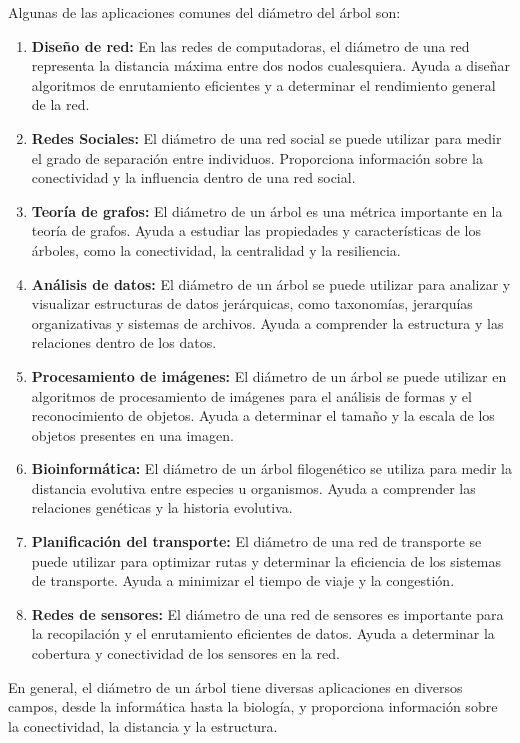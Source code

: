 Algunas de las aplicaciones comunes del diámetro del árbol  son:

\begin{enumerate}
	\item \textbf{Diseño de red:} En las redes de computadoras, el diámetro de una red representa la distancia máxima entre dos nodos cualesquiera. Ayuda a diseñar algoritmos de enrutamiento eficientes y a determinar el rendimiento general de la red.
	\item \textbf{Redes Sociales:}  El diámetro de una red social se puede utilizar para medir el grado de separación entre individuos. Proporciona información sobre la conectividad y la influencia dentro de una red social.
	\item \textbf{Teoría de grafos:} El diámetro de un árbol es una métrica importante en la teoría de grafos. Ayuda a estudiar las propiedades y características de los árboles, como la conectividad, la centralidad y la resiliencia.
	
	\item \textbf{Análisis de datos:} El diámetro de un árbol se puede utilizar para analizar y visualizar estructuras de datos jerárquicas, como taxonomías, jerarquías organizativas y sistemas de archivos. Ayuda a comprender la estructura y las relaciones dentro de los datos.
	
	\item \textbf{Procesamiento de imágenes:} El diámetro de un árbol se puede utilizar en algoritmos de procesamiento de imágenes para el análisis de formas y el reconocimiento de objetos. Ayuda a determinar el tamaño y la escala de los objetos presentes en una imagen.
	
	\item \textbf{Bioinformática:} El diámetro de un árbol filogenético se utiliza para medir la distancia evolutiva entre especies u organismos. Ayuda a comprender las relaciones genéticas y la historia evolutiva.
	
	\item \textbf{Planificación del transporte:} El diámetro de una red de transporte se puede utilizar para optimizar rutas y determinar la eficiencia de los sistemas de transporte. Ayuda a minimizar el tiempo de viaje y la congestión.
	
	\item \textbf{Redes de sensores:} El diámetro de una red de sensores es importante para la recopilación y el enrutamiento eficientes de datos. Ayuda a determinar la cobertura y conectividad de los sensores en la red.
\end{enumerate}

En general, el diámetro de un árbol tiene diversas aplicaciones en diversos campos, desde la informática hasta la biología, y proporciona información sobre la conectividad, la distancia y la estructura.
 

